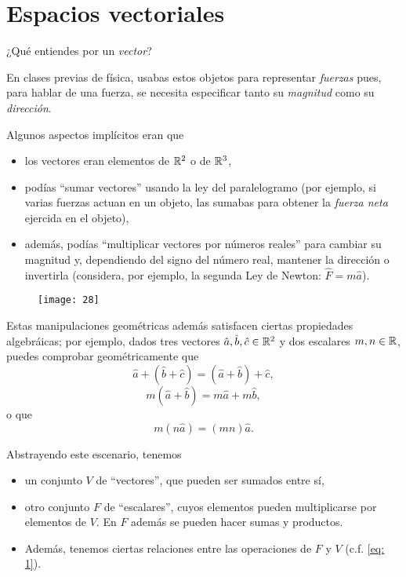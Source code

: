 \chapter{Espacios vectoriales}



¿Qué entiendes por un \textit{vector}?

En clases previas de física, usabas estos objetos para representar
\textit{fuerzas} pues, para hablar de una fuerza,
se necesita especificar tanto su 
\textit{magnitud} como su 
\textit{dirección}.


Algunos aspectos implícitos eran que 
\begin{itemize}
\item los vectores eran elementos de
$\mathbb{R}^{2}$ o de $\mathbb{R}^{3}$, 
\item podías ``sumar vectores'' usando la ley
del paralelogramo (por ejemplo, si varias fuerzas actuan en un objeto, las sumabas para
obtener la \textit{fuerza neta} ejercida en el objeto),
\item además, podías ``multiplicar vectores
por números reales'' para cambiar su 
magnitud y, dependiendo del signo del número real,
mantener la dirección o invertirla (considera, por ejemplo, la 
segunda Ley de Newton: $\hat{F} = m \hat{a}$).
\end{itemize}

\begin{center}
\begin{figure}[H]
	\centering
	\texttt{[image: 28]} 
\end{figure}
\end{center}


Estas manipulaciones geométricas además satisfacen
ciertas propiedades algebráicas; por ejemplo, 
dados tres vectores $\hat{a}, \hat{b}, \hat{c} \in \mathbb{R}^{2}$
y dos escalares $m, n \in \mathbb{R}$, puedes comprobar geométricamente que
\[
\hat{a} + (\hat{b} + \hat{c}) = (\hat{a} + \hat{b}) + \hat{c},
\]
\begin{equation}
	\label{eq: 1}
	m (\hat{a} + \hat{b}) = m \hat{a} + m \hat{b},
\end{equation}
o que 
\[
m(n\hat{a}) = (mn) \hat{a}.
\]

Abstrayendo este escenario, tenemos
\begin{itemize}
	\item un conjunto $V$ de ``vectores'', que pueden ser sumados entre sí,
	\item otro conjunto $F$ de ``escalares'', cuyos elementos pueden multiplicarse 
	por elementos de $V$. En $F$ además se pueden hacer sumas y productos.
	\item Además, tenemos ciertas relaciones entre las operaciones de $F$ y $V$
	(c.f. \eqref{eq: 1}).
\end{itemize}

